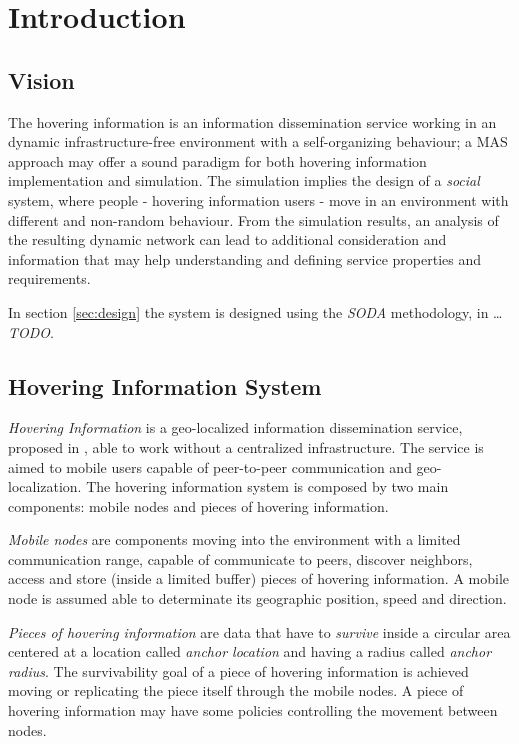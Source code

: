 \section{Introduction}

\subsection{Vision}

The hovering information is an information dissemination service working in an
dynamic infrastructure-free environment with a self-organizing behaviour; a MAS
approach may offer a sound paradigm for both hovering information
implementation and simulation. The simulation implies the design of a
\emph{social} system, where people - hovering information users - move in an
environment with different and non-random behaviour. From the simulation
results, an analysis of the resulting dynamic network can lead to additional
consideration and information that may help understanding and defining service
properties and requirements.

In section \ref{sec:design} the system is designed using the \emph{SODA}
methodology, in \ldots\emph{TODO}.

\subsection{Hovering Information System}

\emph{Hovering Information} is a geo-localized information dissemination
service, proposed in \cite{hover}, able to work without a centralized
infrastructure. The service is aimed to mobile users capable of peer-to-peer
communication and geo-localization. The hovering information system is composed
by two main components: mobile nodes and pieces of hovering information.

\emph{Mobile nodes} are components moving into the environment with a limited
communication range, capable of communicate to peers, discover neighbors,
access and store (inside a limited buffer) pieces of hovering information. A
mobile node is assumed able to determinate its geographic position, speed and
direction.

\emph{Pieces of hovering information} are data that have to \emph{survive}
inside a circular area centered at a location called \emph{anchor location} and
having a radius called \emph{anchor radius}. The survivability goal of a piece
of hovering information is achieved moving or replicating the piece itself
through the mobile nodes. A piece of hovering information may have some
policies controlling the movement between nodes.

